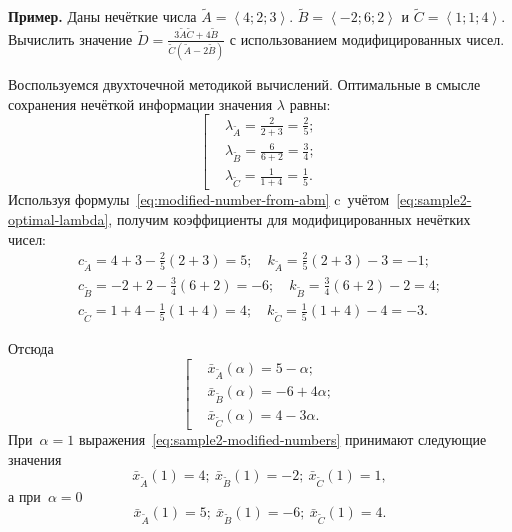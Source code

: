 \textbf{Пример.} Даны нечёткие числа $\tilde{A}=\left\langle 4;2;3 \right\rangle $. $\tilde{B}=\left\langle -2;6;2 \right\rangle $ и $\tilde{C}=\left\langle 1;1;4 \right\rangle $. Вычислить значение $\displaystyle \tilde{D}=\frac{3\tilde{A}\tilde{C}+4\tilde{B}}{\tilde{C}\left( \tilde{A}-2\tilde{B} \right)}$ с использованием модифицированных чисел.

Воспользуемся двухточечной методикой вычислений. Оптимальные в смысле сохранения нечёткой информации значения $\lambda$ равны:
\begin{equation}
\label{eq:sample2-optimal-lambda}
  \left[ \begin{aligned}
    & \lambda_{\tilde A}=\frac{2}{2+3}=\frac{2}{5}; \\ 
    & \lambda_{\tilde B}=\frac{6}{6+2}=\frac{3}{4}; \\ 
    & \lambda_{\tilde C}=\frac{1}{1+4}=\frac{1}{5}.
  \end{aligned} \right.
\end{equation}
Используя формулы~\eqref{eq:modified-number-from-abm} c~учётом~\eqref{eq:sample2-optimal-lambda}, получим коэффициенты для модифицированных нечётких чисел:
\begin{gather*}
  c_{\tilde A}=4+3-\frac{2}{5}\left( 2+3 \right)=5;\quad k_{\tilde A}=\frac{2}{5}\left( 2+3 \right)-3=-1; \\ 
  c_{\tilde B}=-2+2-\frac{3}{4}\left( 6+2 \right)=-6;\quad k_{\tilde B}=\frac{3}{4}\left( 6+2 \right)-2=4; \\ 
  c_{\tilde C}=1+4-\frac{1}{5}\left( 1+4 \right)=4;\quad k_{\tilde C}=\frac{1}{5}\left( 1+4 \right)-4=-3.
\end{gather*}

Отсюда
\begin{equation}
\label{eq:sample2-modified-numbers}
  \left[ \begin{aligned}
    & \bar{x}_{\tilde A}\left( \alpha  \right)=5-\alpha;  \\ 
    & \bar{x}_{\tilde B}\left( \alpha  \right)=-6+4\alpha;  \\ 
    & \bar{x}_{\tilde C}\left( \alpha  \right)=4-3\alpha.
  \end{aligned} \right.
\end{equation}
При~$\alpha=1$ выражения~\eqref{eq:sample2-modified-numbers} принимают следующие значения
\begin{equation*}
  \bar{x}_{\tilde A}\left( 1 \right)=4;\ \bar{x}_{\tilde B}\left( 1 \right)=-2;\ \bar{x}_{\tilde C}\left( 1 \right)=1,
\end{equation*}
а при~$\alpha=0$
\begin{equation*}
  \bar{x}_{\tilde A}\left( 1 \right)=5;\ \bar{x}_{\tilde B}\left( 1 \right)=-6;\ \bar{x}_{\tilde C}\left( 1 \right)=4.
\end{equation*}

